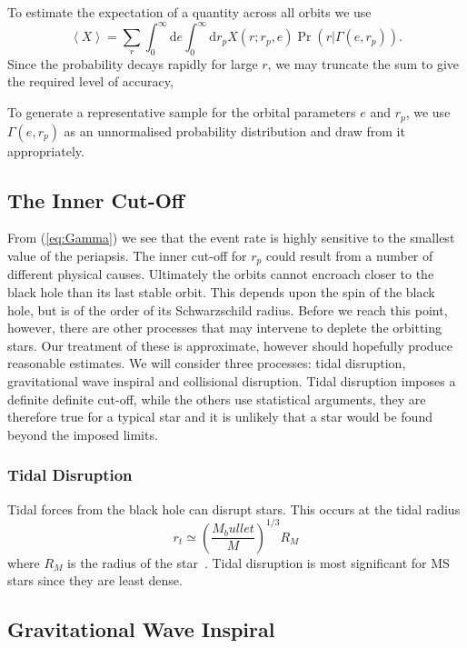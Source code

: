 \documentclass[useAMS,usenatbib]{mn2e}
\newcommand{\eqnref}[1]{(\ref{eq:#1})}
\newcommand{\dd}{\ensuremath{\mathrm{d}}}
\begin{document}
To estimate the expectation of a quantity across all orbits we use
\begin{equation}
\left\langle X\right\rangle = \sum_r \int_0^\infty \dd e \int_0^\infty \dd r_p X(r;r_p,e)\Pr(r|\Gamma(e, r_p)).
\end{equation}
Since the probability decays rapidly for large $r$, we may truncate the sum to give the required level of accuracy,

To generate a representative sample for the orbital parameters $e$ and $r_p$, we use $\Gamma(e, r_p)$ as an unnormalised probability distribution and draw from it appropriately.

\subsection{The Inner Cut-Off}

From \eqnref{Gamma} we see that the event rate is highly sensitive to the smallest value of the periapsis. The inner cut-off for $r_p$ could result from a number of different physical causes. Ultimately the orbits cannot encroach closer to the black hole than its last stable orbit. This depends upon the spin of the black hole, but is of the order of its Schwarzschild radius. Before we reach this point, however, there are other processes that may intervene to deplete the orbitting stars. Our treatment of these is approximate, however should hopefully produce reasonable estimates. We will consider three processes: tidal disruption, gravitational wave inspiral and collisional disruption. Tidal disruption imposes a definite definite cut-off, while the others use statistical arguments, they are therefore true for a typical star and it is unlikely that a star would be found beyond the imposed limits.

\subsubsection{Tidal Disruption}

Tidal forces from the black hole can disrupt stars. This occurs at the tidal radius
\begin{equation}
r_t \simeq \left(\frac{M_bullet}{M}\right)^{1/3}R_M
\end{equation}
where $R_M$ is the radius of the star~\cite{Kobayashi2004}. Tidal disruption is most significant for MS stars since they are least dense.

\subsection{Gravitational Wave Inspiral}
\end{document}
